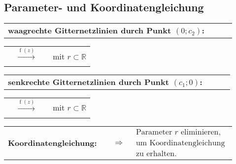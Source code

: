 		\subsection{Parameter- und Koordinatengleichung}
			\begin{minipage}[t]{0.2\textwidth}
				
			\end{minipage}
			\begin{minipage}[t]{0.8\textwidth}
				\begin{tabular}{llll}
					\textbf{waagrechte Gitternetzlinien durch Punkt $(0; c_2)$:} & &\\[3pt]
				\end{tabular}
				\begin{tabular}{llll}
					\fbox{$z = \operatorname{z}\left( r \right) = r + \mathrm{j} c_2$} & $\xrightarrow[]{\operatorname{f}\left( z \right)}$ & \fbox{$w = \operatorname{w}\left( r \right) = \operatorname{f}\left( \operatorname{z}\left( r \right) \right) = \operatorname{f}\left( r + \mathrm{j} c_2 \right)$} & mit $r \subset \mathbb{R}$\\[3pt]
				\end{tabular}
				\begin{tabular}{llll}
					\textbf{senkrechte Gitternetzlinien durch Punkt $(c_1; 0)$:} & & &\\[3pt]
				\end{tabular}
				\begin{tabular}{llll}
					\fbox{$z = \operatorname{z}\left( r \right) = c_1 + \mathrm{j} r$} & $\xrightarrow[]{\operatorname{f}\left( z \right)}$ & \fbox{$w = \operatorname{w}\left( r \right) = \operatorname{f}\left( \operatorname{z}\left( r \right) \right) = \operatorname{f}\left( c_1 + \mathrm{j} r \right)$} & mit $r \subset \mathbb{R}$\\[3pt]
				\end{tabular}
				\begin{tabular}{llll}
					\textbf{Koordinatengleichung:} & 
					\fbox{$\left| \begin{array}{c}
						w_1 = \operatorname{Re}\left(\left[ \operatorname{f}\left(\operatorname{z}\left(r \right)\right)\right]\right)\\[3pt]
						w_2 = \operatorname{Re}\left(\left[ \operatorname{f}\left(\operatorname{z}\left(r \right)\right)\right]\right)
						\end{array} \right|$} &
					$\Rightarrow$ & 
					$\begin{array}{l}
						\text{Parameter $r$ eliminieren,}\\[3pt]
						\text{um Koordinatengleichung}\\[3pt]
						\text{zu erhalten.}
					\end{array}$
				\end{tabular}
			\end{minipage}
		
